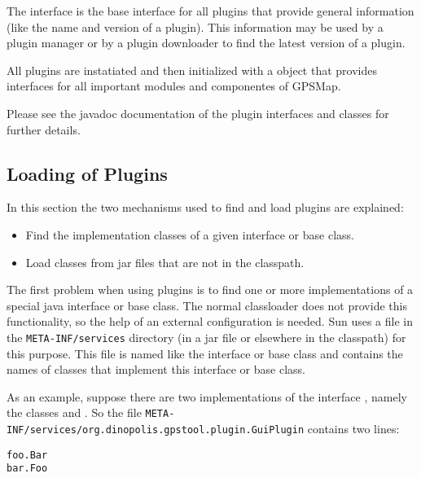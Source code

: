 \documentclass[a4paper]{article} %
\begin{document}
The interface  is the base interface for all
plugins that provide general information (like the name and version of
a plugin). This information may be used by a plugin manager or by a
plugin downloader to find the latest version of a plugin.

All plugins are instatiated and then initialized with a
 object that provides interfaces for all
important modules and componentes of GPSMap.

Please see the javadoc documentation of the plugin interfaces and
classes for further details.

\subsection{Loading of Plugins}
\label{SoftwareDesignOfTheGpstoolPackage-LoadingOfPlugins}

In this section the two mechanisms used to find and load plugins are
explained: 

\begin{itemize}

\item Find the implementation classes of a given interface or base
class. 

\item Load classes from jar files that are not in the classpath.

\end{itemize}

The first problem when using plugins is to find one or more
implementations of a special java interface or base class. The normal
classloader does not provide this functionality, so the help of an
external configuration is needed. Sun uses a file in the
\texttt{META-INF/services} directory (in a jar file or elsewhere in
the classpath) for this purpose. This file is named like the interface
or base class and contains the names of classes that implement this
interface or base class.

As an example, suppose there are two implementations of the interface
, namely the
classes  and . So the file
\texttt{META-INF/services/org.dinopolis.gpstool.plugin.GuiPlugin}
contains two lines:
\begin{verbatim}
foo.Bar
bar.Foo
\end{verbatim}
\end{document}
